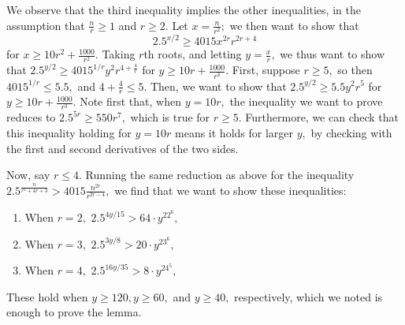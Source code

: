 \documentclass{article}
\theoremstyle{definition}
\theoremstyle{remark}
\begin{document}
We observe that the third inequality implies the other inequalities, in the assumption that $\frac{n}{r} \geq 1$ and $r \geq 2.$ Let $x = \frac{n}{r^2};$ we then want to show that $$2.5^{x/2} \geq 4015 x^{2r} r^{2r + 4}$$ for $x \geq 10r^2 + \frac{1000}{r^2}.$ Taking $r$th roots, and letting $y = \frac{x}{r},$ we thus want to show that $2.5^{y/2} \geq 4015^{1/r} y^2 r^{4 + \frac{4}{r}}$ for $y \geq 10r + \frac{1000}{r^3}.$ First, suppose $r \geq 5,$ so then $4015^{1/r} \leq 5.5,$ and $4 + \frac{4}{r} \leq 5.$ Then, we want to show that $2.5^{y/2} \geq 5.5y^2r^5$ for $y \geq 10r + \frac{1000}{r^3}.$ Note first that, when $y = 10r,$ the inequality we want to prove reduces to $2.5^{5r} \geq 550 r^7,$ which is true for $r \geq 5.$ Furthermore, we can check that this inequality holding for $y = 10r$ means it holds for larger $y,$ by checking with the first and second derivatives of the two sides.
\par Now, say $r \leq 4.$ Running the same reduction as above for the inequality $2.5^{\frac{n}{r^2 + 4r + 3}} > 4015 \frac{n^{2r}}{r^{2r - 4}},$ we find that we want to show these inequalities:
\begin{enumerate}
    \item When $r = 2,$ $2.5^{4y/15} > 64 \cdot y^22^6,$
    \item When $r = 3,$ $2.5^{3y/8} > 20 \cdot y^23^6,$
    \item When $r = 4,$ $2.5^{16y/35} > 8 \cdot y^24^5,$
\end{enumerate}
These hold when $y \geq 120, y \geq 60,$ and $y \geq 40,$ respectively, which we noted is enough to prove the lemma.
\printbibliography
\end{document}
